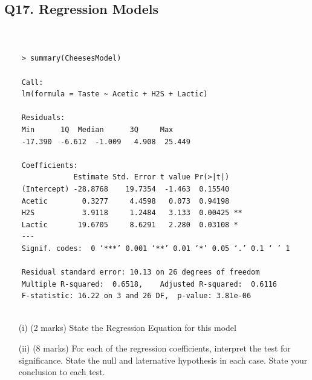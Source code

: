 \documentclass[a4paper,12pt]{article}
\begin{document}
\subsection*{Q17. Regression Models}
\begin{framed}
	\begin{verbatim}
	
	
	> summary(CheesesModel)
	
	Call:
	lm(formula = Taste ~ Acetic + H2S + Lactic)
	
	Residuals:
	Min      1Q  Median      3Q     Max 
	-17.390  -6.612  -1.009   4.908  25.449 
	
	Coefficients:
	            Estimate Std. Error t value Pr(>|t|)   
	(Intercept) -28.8768    19.7354  -1.463  0.15540   
	Acetic        0.3277     4.4598   0.073  0.94198   
	H2S           3.9118     1.2484   3.133  0.00425 **
	Lactic       19.6705     8.6291   2.280  0.03108 * 
	---
	Signif. codes:  0 ‘***’ 0.001 ‘**’ 0.01 ‘*’ 0.05 ‘.’ 0.1 ‘ ’ 1
	
	Residual standard error: 10.13 on 26 degrees of freedom
	Multiple R-squared:  0.6518,    Adjusted R-squared:  0.6116 
	F-statistic: 16.22 on 3 and 26 DF,  p-value: 3.81e-06
	
	\end{verbatim}
\end{framed}
\begin{itemize}
	\item[(i)] (2 marks)
	State the Regression Equation for this model
	\item[(ii)] (8 marks) For each of the regression coefficients, interpret the test for significance. State the null and laternative hypothesis in each case. State your conclusion to each test.
	
\end{itemize}

\newpage
\end{document}
